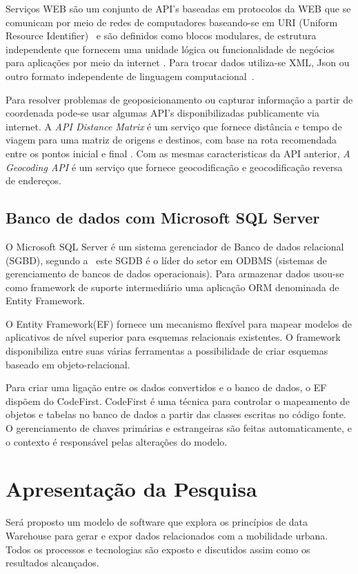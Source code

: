 \documentclass[12pt]{article}
\begin{document}
Serviços WEB são um conjunto de API's baseadas em protocolos da WEB que se comunicam por meio de redes de computadores baseando-se em URI (Uniform Resource Identifier)~\cite{site06} e são definidos como blocos modulares, de estrutura independente que fornecem uma unidade lógica ou funcionalidade de negócios para aplicações por meio da internet \cite{art06}. Para trocar dados utiliza-se XML, Json ou outro formato independente de linguagem computacional~\cite{site07}.

Para resolver problemas de geoposicionamento ou capturar informação a partir de coordenada pode-se usar algumas API's disponibilizadas publicamente via internet. A \textit{API Distance Matrix} é um serviço que fornece distância e tempo de viagem para uma matriz de origens e destinos, com base na rota recomendada entre os pontos inicial e final \cite{site02}. Com as mesmas caracteristicas da API anterior, \textit{A Geocoding API} é um serviço que fornece geocodificação e geocodificação reversa de endereços\cite{site03}. 

\subsection{Banco de dados com Microsoft SQL Server}\label{sec:DBORM}
O Microsoft SQL Server é um sistema gerenciador de Banco de dados relacional (SGBD), segundo a~\cite{site04} este SGDB é o líder do setor em ODBMS (sistemas de gerenciamento de bancos de dados operacionais). Para armazenar dados usou-se como framework de suporte intermediário uma aplicação ORM denominada de Entity Framework.

O Entity Framework(EF) fornece um mecanismo flexível para mapear modelos de aplicativos de nível superior para esquemas relacionais existentes. O framework disponibiliza entre suas várias ferramentas a possibilidade de criar esquemas baseado em objeto-relacional. 

Para criar uma ligação entre os dados convertidos e o banco de dados, o EF dispõem do CodeFirst. CodeFirst é uma técnica para controlar o mapeamento de objetos e tabelas no banco de dados a partir das classes escritas no código fonte. O gerenciamento de chaves primárias e estrangeiras são feitas automaticamente, e o contexto é responsável pelas alterações do modelo.

\section{Apresentação da Pesquisa}\label{sec:horaDoShow}
Será proposto um modelo de software que explora os princípios de data Warehouse para gerar e expor dados relacionados com a mobilidade urbana. Todos os processos e tecnologias são exposto e discutidos assim como os resultados alcançados.
\end{document}

